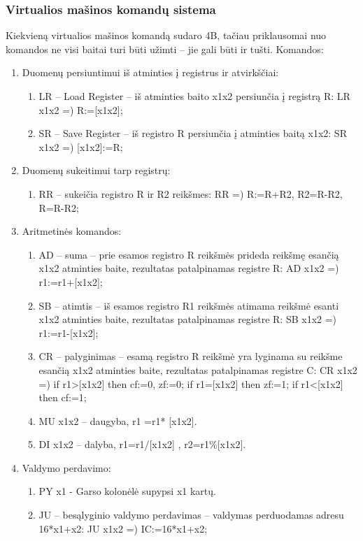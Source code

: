 \documentclass[oneside]{VUMIFPSkursinis}
\begin{document}
	\subsubsection{Virtualios mašinos komandų sistema}
Kiekvieną virtualios mašinos komandą sudaro 4B, tačiau priklausomai nuo komandos ne visi
baitai turi būti užimti – jie gali būti ir tušti.
Komandos:
\begin{enumerate}
\item Duomenų persiuntimui iš atminties į registrus ir atvirkščiai:
\begin{enumerate}
\item  LR – Load Register – iš atminties baito x1x2 persiunčia į registrą R:
LR x1x2 =) R:=[x1x2];
\item SR – Save Register – iš registro R persiunčia į atminties baitą x1x2:
SR x1x2 =) [x1x2]:=R;
\end{enumerate}
\item Duomenų sukeitimui tarp registrų:
\begin{enumerate}
\item RR – sukeičia registro R ir R2 reikšmes:
RR =) R:=R+R2, R2=R-R2, R=R-R2;
\end{enumerate}
\item Aritmetinės komandos:
\begin{enumerate}
\item AD – suma – prie esamos registro R reikšmės prideda reikšmę esančią x1x2 atminties
baite, rezultatas patalpinamas registre R:
AD x1x2 =) r1:=r1+[x1x2];
\item SB – atimtis – iš esamos registro R1 reikšmės atimama reikšmė esanti x1x2 atminties
baite, rezultatas patalpinamas registre R:
SB x1x2 =) r1:=r1-[x1x2];
\item CR – palyginimas – esamą registro R reikšmė yra lyginama su reikšme esančią x1x2
atminties baite, rezultatas patalpinamas registre C:
CR x1x2 =)
if r1>[x1x2] then cf:=0, zf:=0;
if r1=[x1x2] then zf:=1;
if r1<[x1x2] then cf:=1;
\item MU x1x2 – daugyba, r1 =r1* [x1x2].
\item DI x1x2 – dalyba, r1=r1/[x1x2] , r2=r1\%[x1x2].
\end{enumerate}
\item Valdymo perdavimo:
\begin{enumerate}
\item PY x1 - Garso kolonėlė supypsi x1 kartų.
\item JU – besąlyginio valdymo perdavimas – valdymas perduodamas adresu 16*x1+x2:
JU x1x2 =) IC:=16*x1+x2;

\end{enumerate}
\end{enumerate}
\end{document}
